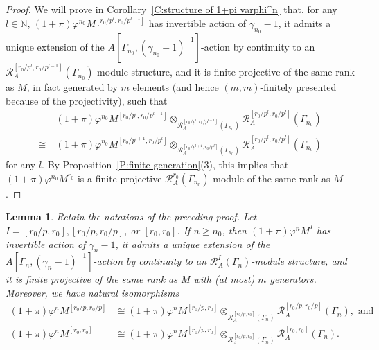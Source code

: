 \documentclass[12pt]{article}
\newtheorem{lemma}[theorem]{Lemma}
\theoremstyle{definition}
\numberwithin{equation}{theorem}
\newcommand{\calR}{\mathcal{R}}
\newcommand{\NN}{\mathbb{N}}
\begin{document}
\begin{proof}
We will prove in Corollary~\ref{C:structure of 1+pi varphi^n} that,
for any $l \in \NN$, $(1+\pi)\varphi^{n_0} M^{[r_0/p^l,r_0/p^{l-1}]}$
has invertible action of $\gamma_{n_0}-1$, it admits a unique
extension of the $A[\Gamma_{n_0},(\gamma_{n_0}-1)^{-1}]$-action by
continuity to an $\calR_A^{[r_0/p^l,r_0/p^{l-1}]}(\Gamma_{n_0})$-module
structure, and it is finite projective of the same rank as $M$, in
fact generated by $m$ elements (and hence $(m,m)$-finitely presented
because of the projectivity), such that
\begin{align*}
&(1+\pi)\varphi^{n_0} M^{[r_0/p^l,r_0/p^{l-1}]} \otimes_{\calR_A^{[r_0/p^l,r_0/p^{l-1}]}(\Gamma_{n_0})} \calR_A^{[r_0/p^l,r_0/p^l]}(\Gamma_{n_0})
\\
\cong\ & (1+\pi)\varphi^{n_0} M^{[r_0/p^{l+1},r_0/p^l]} \otimes_{\calR_A^{[r_0/p^{l+1},r_0/p^l]}(\Gamma_{n_0})} \calR_A^{[r_0/p^l,r_0/p^l]}(\Gamma_{n_0})
\end{align*}
 for any $l$.
By Proposition~\ref{P:finite-generation}(3), this implies that $(1+\pi)\varphi^{n_0} M^{r_0}$ is a finite projective $\calR_A^{r_0}(\Gamma_{n_0})$-module of the same rank as $M$.
\end{proof}

\begin{lemma}
\label{L:(1+pi)phi(D) finite projective}
Retain the notations of the preceding proof.  Let $I = [r_0/p, r_0],
[r_0/p, r_0/p]$, or $[r_0,r_0]$.  If $n \geq n_0$, then
$(1+\pi)\varphi^n M^{I}$ has invertible action of $\gamma_n-1$, it
admits a unique extension of the
$A[\Gamma_n,(\gamma_n-1)^{-1}]$-action by continuity to an
$\calR_A^{I}(\Gamma_n)$-module structure, and it is finite projective
of the same rank as $M$ with (at most) $m$ generators.  Moreover, we
have natural isomorphisms
\begin{align*}
(1+\pi)\varphi^n M^{[r_0/p, r_0/p]} &\cong 
(1+\pi)\varphi^n M^{[r_0/p, r_0]} \otimes_{\calR_A^{[r_0/p, r_0]}(\Gamma_n)} \calR_A^{[r_0/p, r_0/p]}(\Gamma_n),\textrm{ and }\\
(1+\pi)\varphi^n M^{[r_0, r_0]} &\cong
(1+\pi)\varphi^n M^{[r_0/p, r_0]} \otimes_{\calR_A^{[r_0/p, r_0]}(\Gamma_n)} \calR_A^{[r_0, r_0]}(\Gamma_n).
\end{align*}
\end{lemma}
\end{document}
